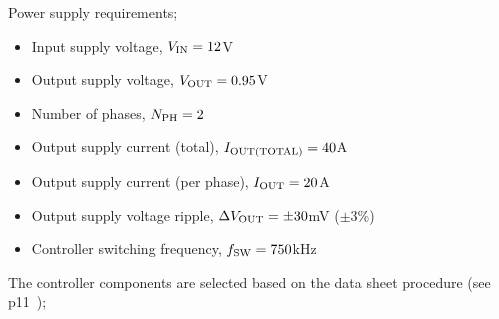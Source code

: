 Power supply requirements;
%
\begin{itemize}
\item Input supply voltage, $V_{\rm IN} = 12$V
\item Output supply voltage, $V_{\rm OUT} = 0.95$V
\item Number of phases, $N_{\rm PH} = 2$
\item Output supply current (total), $I_{\rm OUT(TOTAL)} = 40$A
\item Output supply current (per phase), $I_{\rm OUT} = 20$A
\item Output supply voltage ripple, $\Delta V_{\rm OUT} = \pm 30$mV ($\pm3$\%)
\item Controller switching frequency, $f_{\rm SW} = 750$kHz
\end{itemize}
%
The controller components are selected based on the data
sheet procedure (see p11~\cite{Linear_LTC3855_2009});
%
